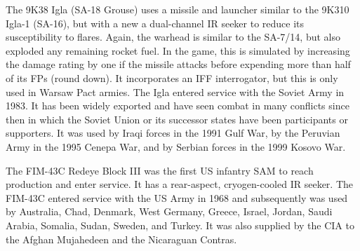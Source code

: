 \begin{withcounters}
    The 9K38 Igla (SA-18 Grouse) uses a missile and launcher similar to the 9K310 Igla-1 (SA-16), but with a new a dual-channel IR seeker to reduce its susceptibility to flares.
    Again, the warhead is similar to the SA-7/14, but also exploded any remaining rocket fuel.
    In the game, this is simulated by increasing the damage rating by one if the missile attacks before expending more than half of its FPs (round down).
    It incorporates an IFF interrogator, but this is only used in Warsaw Pact armies.
    The Igla entered service with the Soviet Army in 1983.
    It has been widely exported and have seen combat in many conflicts since then in which the Soviet Union or its successor states have been participants or supporters.
    It was used by Iraqi forces in the 1991 Gulf War, by the Peruvian Army in the 1995 Cenepa War, and by Serbian forces in the 1999 Kosovo War.%


    The FIM-43C Redeye Block III was the first US infantry SAM to reach production and enter service.
    It has a rear-aspect, cryogen-cooled IR seeker.
    The FIM-43C entered service with the US Army in 1968 and subsequently was used by Australia, Chad, Denmark, West Germany, Greece, Israel, Jordan, Saudi Arabia, Somalia, Sudan, Sweden, and Turkey. It was also supplied by the CIA to the Afghan Mujahedeen and the Nicaraguan Contras.%


\end{withcounters}
